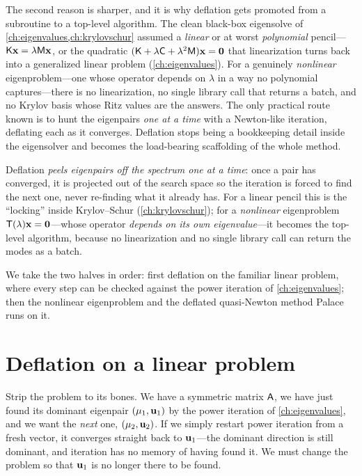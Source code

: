 The second reason is sharper, and it is why deflation gets promoted from a
subroutine to a top-level algorithm. The clean black-box eigensolve of
\cref{ch:eigenvalues,ch:krylovschur} assumed a \emph{linear} or at worst
\emph{polynomial} pencil---$\mathsf{K}\mathbf{x}=\lambda\mathsf{M}\mathbf{x}$, or the quadratic
$(\mathsf{K}+\lambda\mathsf{C}+\lambda^2\mathsf{M})\mathbf{x}=\mathbf 0$ that linearization turns back into
a generalized linear problem (\cref{ch:eigenvalues}). For a genuinely
\emph{nonlinear} eigenproblem---one whose operator depends on $\lambda$ in a way
no polynomial captures---there is no linearization, no single library call that
returns a batch, and no Krylov basis whose Ritz values are the answers. The only
practical route known is to hunt the eigenpairs \emph{one at a time} with a
Newton-like iteration, deflating each as it converges. Deflation stops being a
bookkeeping detail inside the eigensolver and becomes the load-bearing
scaffolding of the whole method.

\begin{keyidea}
Deflation \emph{peels eigenpairs off the spectrum one at a time}: once a pair has
converged, it is projected out of the search space so the iteration is forced to
find the next one, never re-finding what it already has. For a linear pencil this
is the ``locking'' inside Krylov--Schur (\cref{ch:krylovschur}); for a
\emph{nonlinear} eigenproblem $\mathsf{T}(\lambda)\mathbf{x}=\mathbf 0$---whose operator
\emph{depends on its own eigenvalue}---it becomes the top-level algorithm, because
no linearization and no single library call can return the modes as a batch.
\end{keyidea}

We take the two halves in order: first deflation on the familiar linear problem,
where every step can be checked against the power iteration of
\cref{ch:eigenvalues}; then the nonlinear eigenproblem and the deflated
quasi-Newton method Palace runs on it.

\section{Deflation on a linear problem}
\label{sec:def-linear}

Strip the problem to its bones. We have a symmetric matrix $\mathsf{A}$, we have
just found its dominant eigenpair $(\mu_1,\mathbf{u}_1)$ by the power iteration of
\cref{ch:eigenvalues}, and we want the \emph{next} one, $(\mu_2,\mathbf{u}_2)$. If we
simply restart power iteration from a fresh vector, it converges straight back to
$\mathbf{u}_1$---the dominant direction is still dominant, and iteration has no memory of
having found it. We must change the problem so that $\mathbf{u}_1$ is no longer there to
be found.

